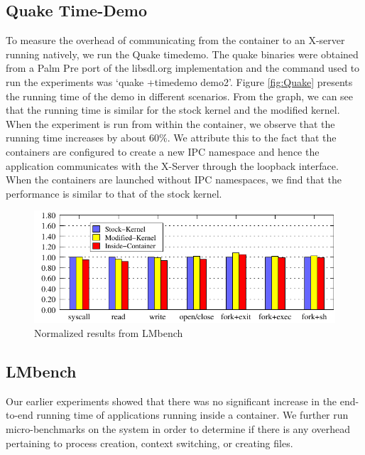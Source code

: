 \subsection{Quake Time-Demo}
\label{sec:quake_demo}
To measure the overhead of communicating from the container to an X-server running natively, we run the Quake timedemo. The quake binaries were obtained from a Palm Pre port of the libsdl.org implementation and the command used to run the experiments was `quake +timedemo demo2'. Figure \ref{fig:Quake} presents the running time of the demo in different scenarios. From the graph, we can see that the running time is similar for the stock kernel and the modified kernel. When the experiment is run from within the container, we observe that the running time increases by about 60\%. We attribute this to the fact that the containers are configured to create a new IPC namespace and hence the application communicates with the X-Server through the loopback interface. When the containers are launched without IPC namespaces, we find that the performance is similar to that of the stock kernel.

\begin{figure}[!t]
\centering
\includegraphics[width=2.0\columnwidth]{lmbench}
\caption{Normalized results from LMbench}
\label{fig:lmbench}
\end{figure}

\subsection{LMbench} 
\label{sec:LMbench3}
Our earlier experiments showed that there was no significant increase in the end-to-end running time of applications running inside a container.  We further run micro-benchmarks on the system in order to determine if there is any overhead pertaining to process creation, context switching, or creating files.\\

